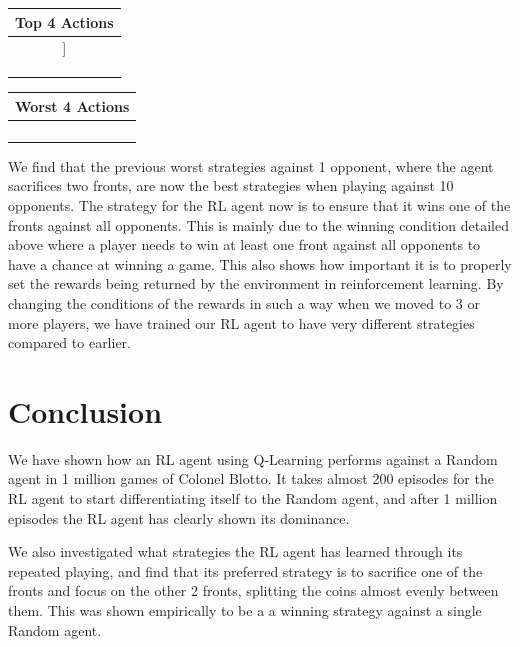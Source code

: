 \documentclass[11pt, oneside]{article}   	%
\begin{document}
\hfill 

\begin{center}
\begin{tabular}{ |c| } 
 \hline
 \textbf{Top 4 Actions} \\ 
 \hline
[10, 0, 0]] \\ 
 \hline
 [5, 0, 5] \\ 
 \hline
[9, 1, 0]\\
 \hline
[0, 10, 0]\\
 \hline
\end{tabular}
\quad
\begin{tabular}{ |c| } 
 \hline
\textbf{Worst 4 Actions} \\ 
 \hline
[4, 4, 2]\\ 
 \hline
[0, 5, 5] \\
 \hline
 [3, 3, 4]\\
 \hline
 [2, 5, 3]\\

 \hline
\end{tabular}

\end{center}

We find that the previous worst strategies against 1 opponent, where the agent sacrifices two fronts, are now the best strategies when playing against 10 opponents. The strategy for the RL agent now is to ensure that it wins one of the fronts against all opponents. This is mainly due to the winning condition detailed above where a player needs to win at least one front against all opponents to have a chance at winning a game. This also shows how important it is to properly set the rewards being returned by the environment in reinforcement learning. By changing the conditions of the rewards in such a way when we moved to 3 or more players, we have trained our RL agent to have very different strategies compared to earlier.

\section{Conclusion}

We have shown how an RL agent using Q-Learning performs against a Random agent in 1 million games of Colonel Blotto. It takes almost 200 episodes for the RL agent to start differentiating itself to the Random agent, and after 1 million episodes the RL agent has clearly shown its dominance.

\hfill

We also investigated what strategies the RL agent has learned through its repeated playing, and find that its preferred strategy is to sacrifice one of the fronts and focus on the other 2 fronts, splitting the coins almost evenly between them. This was shown empirically to be a a winning strategy against a single Random agent.
\end{document}
